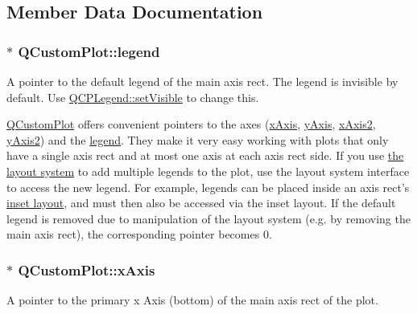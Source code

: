 \subsection{\-Member \-Data \-Documentation}
\hypertarget{classQCustomPlot_a4eadcd237dc6a09938b68b16877fa6af}{
\subsubsection[{legend}]{ $\ast$ {\bf \-Q\-Custom\-Plot\-::legend}}}\label{classQCustomPlot_a4eadcd237dc6a09938b68b16877fa6af}
\-A pointer to the default legend of the main axis rect. \-The legend is invisible by default. \-Use \hyperlink{classQCPLayerable_a3bed99ddc396b48ce3ebfdc0418744f8}{\-Q\-C\-P\-Legend\-::set\-Visible} to change this.

\hyperlink{classQCustomPlot}{\-Q\-Custom\-Plot} offers convenient pointers to the axes (\hyperlink{classQCustomPlot_a9a79cd0158a4c7f30cbc702f0fd800e4}{x\-Axis}, \hyperlink{classQCustomPlot_af6fea5679725b152c14facd920b19367}{y\-Axis}, \hyperlink{classQCustomPlot_ada41599f22cad901c030f3dcbdd82fd9}{x\-Axis2}, \hyperlink{classQCustomPlot_af13fdc5bce7d0fabd640f13ba805c0b7}{y\-Axis2}) and the \hyperlink{classQCustomPlot_a4eadcd237dc6a09938b68b16877fa6af}{legend}. \-They make it very easy working with plots that only have a single axis rect and at most one axis at each axis rect side. \-If you use \hyperlink{}{the layout system} to add multiple legends to the plot, use the layout system interface to access the new legend. \-For example, legends can be placed inside an axis rect's \hyperlink{classQCPAxisRect_a4114887c7141b59650b7488f930993e5}{inset layout}, and must then also be accessed via the inset layout. \-If the default legend is removed due to manipulation of the layout system (e.\-g. by removing the main axis rect), the corresponding pointer becomes 0. \hypertarget{classQCustomPlot_a9a79cd0158a4c7f30cbc702f0fd800e4}{
\subsubsection[{x\-Axis}]{ $\ast$ {\bf \-Q\-Custom\-Plot\-::x\-Axis}}}\label{classQCustomPlot_a9a79cd0158a4c7f30cbc702f0fd800e4}
\-A pointer to the primary x \-Axis (bottom) of the main axis rect of the plot.

